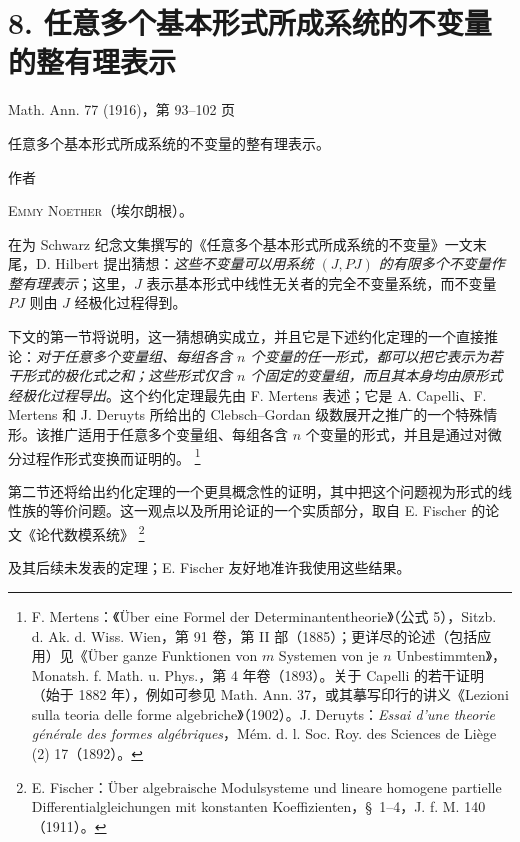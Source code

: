 \documentclass[11pt]{article}
\providecommand{\NoetherSrcNote}[2]{%
  \begingroup\renewcommand{\thefootnote}{#1}\footnote{#2}\addtocounter{footnote}{-1}\endgroup}
\begin{document}
\setcounter{footnote}{0}
\section*{8. 任意多个基本形式所成系统的不变量的整有理表示}
\begin{center}
Math. Ann. 77 (1916)，第 93--102 页
\end{center}

\begin{center}
{\Large 任意多个基本形式所成系统的不变量的整有理表示。}\par
\vspace{1.2em}
作者\par
\vspace{0.8em}
{\scshape Emmy Noether}（埃尔朗根）。
\end{center}

在为 Schwarz 纪念文集撰写的《任意多个基本形式所成系统的不变量》一文末尾，D. Hilbert 提出猜想：\emph{这些不变量可以用系统 $(J,PJ)$ 的有限多个不变量作整有理表示}；这里，$J$ 表示基本形式中线性无关者的完全不变量系统，而不变量 $PJ$ 则由 $J$ 经极化过程得到。

下文的第一节将说明，这一猜想确实成立，并且它是下述约化定理的一个直接推论：\emph{对于任意多个变量组、每组各含 $n$ 个变量的任一形式，都可以把它表示为若干形式的极化式之和；这些形式仅含 $n$ 个固定的变量组，而且其本身均由原形式经极化过程导出}。这个约化定理最先由 F. Mertens 表述；它是 A. Capelli、F. Mertens 和 J. Deruyts 所给出的 Clebsch--Gordan 级数展开之推广的一个特殊情形。该推广适用于任意多个变量组、每组各含 $n$ 个变量的形式，并且是通过对微分过程作形式变换而证明的。\NoetherSrcNote{*)}{F. Mertens：《Über eine Formel der Determinantentheorie》（公式 5），Sitzb. d. Ak. d. Wiss. Wien，第 91 卷，第 II 部（1885）；更详尽的论述（包括应用）见《Über ganze Funktionen von $m$ Systemen von je $n$ Unbestimmten》，Monatsh. f. Math. u. Phys.，第 4 年卷（1893）。关于 Capelli 的若干证明（始于 1882 年），例如可参见 Math. Ann. 37，或其摹写印行的讲义《Lezioni sulla teoria delle forme algebriche》（1902）。J. Deruyts：\emph{Essai d'une theorie générale des formes algébriques}，Mém. d. l. Soc. Roy. des Sciences de Liège (2) 17（1892）。}

第二节还将给出约化定理的一个更具概念性的证明，其中把这个问题视为形式的线性族的等价问题。这一观点以及所用论证的一个实质部分，取自 E. Fischer 的论文《论代数模系统》\NoetherSrcNote{*)}{E. Fischer：Über algebraische Modulsysteme und lineare homogene partielle Differentialgleichungen mit konstanten Koeffizienten，\S\ 1--4，J. f. M. 140（1911）。}及其后续未发表的定理；E. Fischer 友好地准许我使用这些结果。
\end{document}
